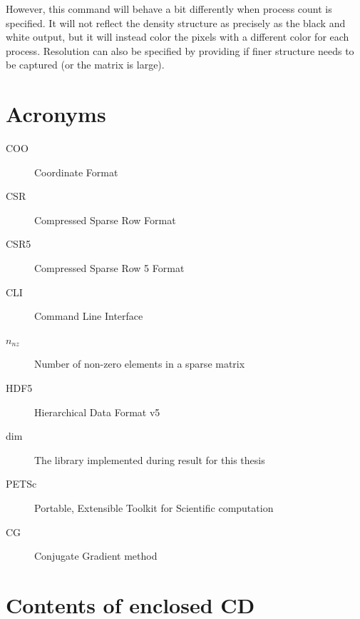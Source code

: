 \documentclass[thesis=M,english]{FITthesis}[2019/12/23]
\begin{document}
However, this command will behave a bit differently when process count  is specified. It will not
reflect the density structure as precisely as the black and white output, but it will instead color the pixels
with a different color for each process. Resolution can also be specified by providing 
if finer structure needs to be captured (or the matrix is large).



\chapter{Acronyms}
\begin{description}
    \item[COO] Coordinate Format
    \item[CSR] Compressed Sparse Row Format
    \item[CSR5] Compressed Sparse Row 5 Format
    \item[CLI] Command Line Interface
    \item[$n_{nz}$] Number of non-zero elements in a sparse matrix
    \item[HDF5] Hierarchical Data Format v5
    \item[dim]  The library implemented during result for this thesis
    \item[PETSc] Portable, Extensible Toolkit for Scientific computation
    \item[CG] Conjugate Gradient method
\end{description}


\chapter{Contents of enclosed CD}

\end{document}
